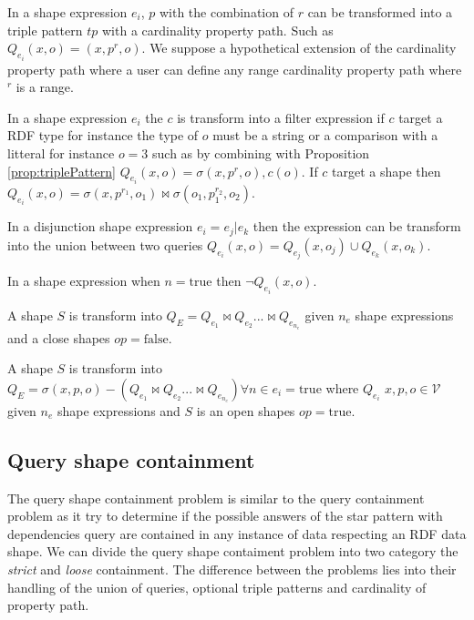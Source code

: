 \begin{prop}\label{prop:triplePattern}
   In a shape expression $e_i$, $p$ with the combination of $r$ can be transformed into a triple pattern $tp$ with a cardinality property path.
   Such as $Q_{e_i}(x,o) = (x, p^r, o)$. 
   We suppose a hypothetical extension of the cardinality property path where a user can define any range cardinality property path where $^r$ is a range.
\end{prop}

\begin{prop}
   In a shape expression $e_i$ the $c$ is transform into a filter expression if $c$ target a RDF type for instance the type of $o$ must be a string or
   a comparison with a litteral for instance $o=3$ such as by combining with Proposition \ref{prop:triplePattern} $Q_{e_i}(x,o) = \sigma(x, p^r, o), c(o)$.
   If $c$ target a shape then $Q_{e_i}(x,o) = \sigma(x, p^{r_{1}}, o_1) \bowtie \sigma(o_1, p_1^{r_2}, o_2)$.
\end{prop}

\begin{prop}
   In a disjunction shape expression $e_i = e_j|e_k$ then the expression can be transform into the union between two queries
   $Q_{e_i}(x,o)= Q_{e_j}(x,o_j) \cup Q_{e_k}(x,o_k)$.
\end{prop}

\begin{prop}
   In a shape expression when $n= \mathrm{true}$ then $\neg Q_{e_i}(x,o)$.
\end{prop}

\begin{prop}
   A shape $S$ is transform into $Q_{E} = Q_{e_1} \bowtie Q_{e_2} ... \bowtie Q_{e_{n_e}}$ given $n_e$ shape expressions and a close shapes $op = \mathrm{false}$.
\end{prop}

\begin{prop}
   A shape $S$ is transform into $Q_{E} = \sigma(x, p, o) -  (Q_{e_1} \bowtie Q_{e_2} ... \bowtie Q_{e_{n_e}}) \forall n \in e_i = \mathrm{true} $ where $Q_{e_i}$ 
   $x,p, o \in \mathcal{V}$ given $n_e$ shape expressions and $S$ is an open shapes $op = \mathrm{true}$.
\end{prop}

\subsection{Query shape containment}
The query shape containment problem is similar to the query containment problem as it 
try to determine if the possible answers of the star pattern with dependencies query are contained in any instance of data respecting an RDF data shape.
We can divide the query shape contaiment problem into two category the \emph{strict} and \emph{loose} containment.
The difference between the problems lies into their handling of the union of queries, optional triple patterns and cardinality of property path.


